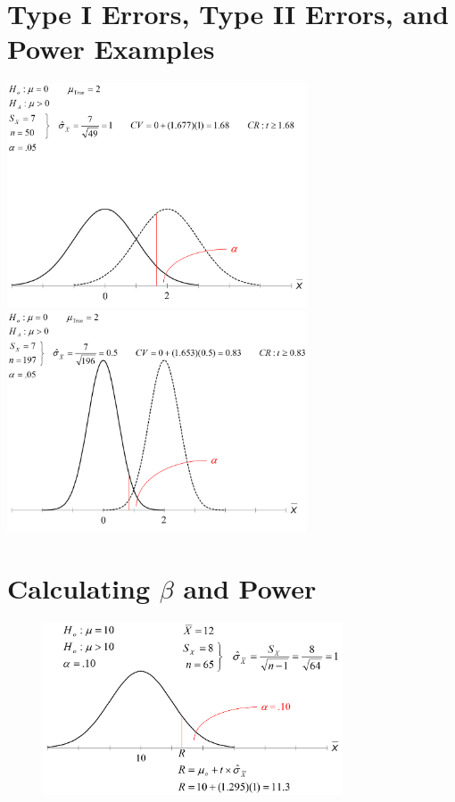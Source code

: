 \documentclass[12pt]{article}
\begin{document}
\section{Type I Errors, Type II Errors, and Power
Examples}\label{type-i-errors-type-ii-errors-and-power-examples}

\includegraphics[width=3.5in]{t1e_examp.png} \includegraphics[width=3.5in]{t1e_examp2.png}

\section{\texorpdfstring{Calculating \(\beta\) and
Power}{Calculating \textbackslash{}beta and Power}}\label{calculating-beta-and-power}

\begin{figure}[H]
\centering
\includegraphics[width=3.5in]{Calc_power1.png}
\caption{}
\end{figure}
\end{document}
